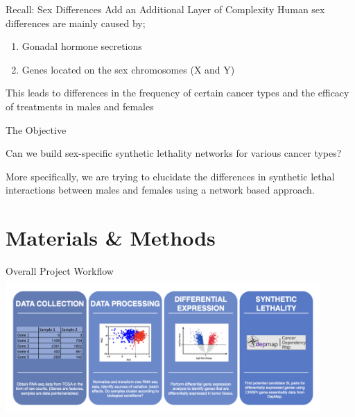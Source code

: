 \documentclass{beamer}
\begin{document}
	\begin{frame}{Recall: Sex Differences Add an Additional Layer of Complexity}
		Human sex differences are mainly caused by;
		\begin{enumerate}
			\item Gonadal hormone secretions
			\item Genes located on the sex chromosomes (X and Y) \newline
		\end{enumerate}
		This leads to differences in the frequency of certain cancer types and the efficacy of treatments in males and females
	\end{frame}

	\begin{frame}{The Objective}
		\begin{center}
			Can we build sex-specific synthetic lethality networks for various cancer types? \newline
			
			More specifically, we are trying to elucidate the differences in synthetic lethal interactions between males and females using a network based approach.
		\end{center}
	\end{frame}

	\section{Materials \& Methods}
	
	\begin{frame}{Overall Project Workflow}
		\includegraphics[width=12cm, height=5.2cm]{img2.png}
	\end{frame}
\end{document}
